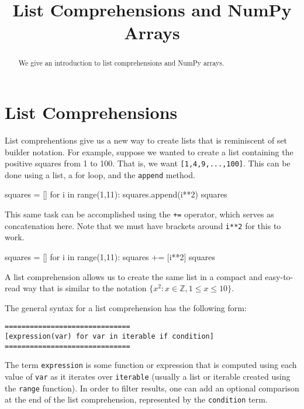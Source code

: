 \documentclass{ximera}
\title{List Comprehensions and NumPy Arrays}
\begin{document}
  
\begin{abstract}  
We give an introduction to list comprehensions and NumPy arrays.
\end{abstract}  
\maketitle

\section{List Comprehensions}

List comprehentions give us a new way to create lists that is reminiscent of set builder notation. For example, suppose we wanted to create a list containing the positive squares from 1 to 100. That is, we want \verb|[1,4,9,...,100]|. This can be done using a list, a for loop, and the \verb|append| method.

\begin{sageCell}
squares = []
for i in range(1,11):
        squares.append(i**2)
squares
\end{sageCell}

This same task can be accomplished using the \verb|+=| operator, which serves as concatenation here. Note that we must have brackets around \verb|i**2| for this to work.

\begin{sageCell}
squares = []
for i in range(1,11):
        squares += [i**2]
squares
\end{sageCell}

A list comprehension allows us to create the same list in a compact and easy-to-read way that is similar to the notation $\{x^2:x\in\mathbb{Z},1\leq x\leq 10\}$.

\begin{sageCell}
\end{sageCell}

The general syntax for a list comprehension has the following form:

\begin{verbatim}
==============================
[expression(var) for var in iterable if condition]
==============================
\end{verbatim}

The term \verb|expression| is some function or expression that is computed using each value of \verb|var| as it iterates over \verb|iterable| (usually a list or iterable created using the \verb|range| function). In order to filter results, one can add an optional comparison at the end of the list comprehension, represented by the \verb|condition| term.
\end{document}
